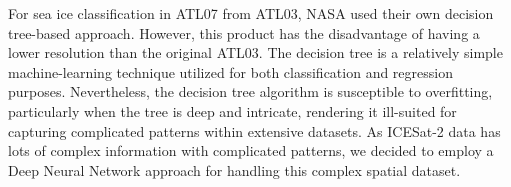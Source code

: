 For sea ice classification in ATL07 from ATL03, NASA used their own decision tree-based approach. However, this product has the disadvantage of having a lower resolution than the original ATL03. The decision tree is a relatively simple machine-learning technique utilized for both classification and regression purposes. 
Nevertheless, the decision tree algorithm is susceptible to overfitting, particularly when the tree is deep and intricate, rendering it ill-suited for capturing complicated patterns within extensive datasets.
As ICESat-2 data has lots of complex information with complicated patterns, we decided to employ a Deep Neural Network approach for handling this complex spatial dataset.   



